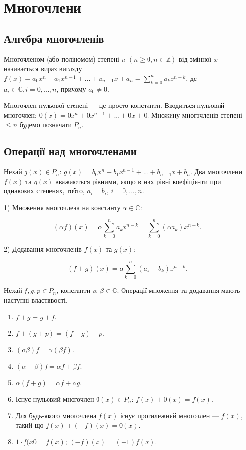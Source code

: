 \chapter{Многочлени}


\section{Алгебра многочленів}

\begin{definition}
	Многочленом (або поліномом) степені $n$ $(n \geqslant 0, n \in \mathbb{Z})$ від змінної $x$
називається вираз вигляду $f(x) = a_0x^n + a_1x^{n-1} + ... + a_{n-1}x + a_n = \sum\limits_{k = 0}^n a_kx^{n-k}$, де
$a_i \in \mathbb{C}, i = 0, ..., n$, причому $a_0 \neq 0$.
\end{definition}

Многочлен нульової степені --- це просто константи. Вводиться нульовий
многочлен: $0(x) = 0x^n + 0x^{n-1} + ... + 0x + 0$. Множину многочленів
степені $\leqslant n$ будемо позначати $P_n$.

\section{Операції над многочленами}

Нехай $g(x) \in P_n$: $g(x) = b_0x^n + b_1x^{n-1} + ... + b_{n-1}x + b_n$. Два
многочлени $f(x)$ та $g(x)$ вважаються рівними, якщо в них рівні коефіцієнти при
однакових степенях, тобто, $a_i = b_i$, $i = 0, ..., n$.


1) Множення многочлена на константу $\alpha \in \mathbb{C}$:

$$(\alpha f)(x) = \alpha\sum\limits_{k=0}^n a_k x^{n-k} = \sum\limits_{k=0}^n (\alpha a_k) x^{n-k}.$$

2) Додавання многочленів $f(x)$ та $g(x)$:

$$(f + g)(x) = \alpha\sum\limits_{k=0}^n (a_k+b_k)x^{n-k}.$$

Нехай $f, g, p \in P_n$, константи $\alpha, \beta \in \mathbb{C}$. Операції множення та додавання
мають наступні властивості.
 
\begin{enumerate}
	\item $f + g = g + f$.
	\item $f + (g + p) = (f + g) + p$.
	\item $(\alpha\beta)f = \alpha(\beta f)$.
	\item $(\alpha + \beta)f = \alpha f + \beta f$.
	\item $\alpha(f + g) = \alpha f + \alpha g$.
	\item Існує нульовий многочлен $0(x) \in P_n$: $f(x) + 0(x) = f(x)$.
	\item Для будь-якого многочлена $f(x)$ існує протилежний многочлен --- $f(x)$, такий що $f(x) + (-f)(x) = 0(x)$.
	\item $1 \cdot f(x0 = f(x)$; $(-f)(x) = (-1)f(x)$.
\end{enumerate}

